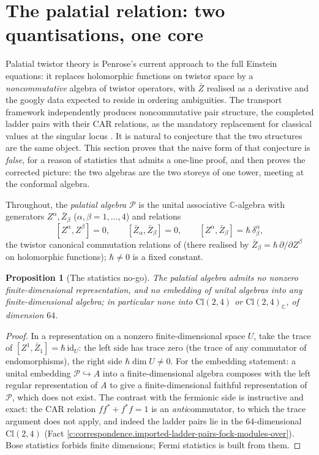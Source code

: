 \documentclass[11pt]{article}
\newtheorem{proposition}[theorem]{Proposition}
\theoremstyle{definition}
\theoremstyle{plain}
\providecommand{\C}{}\renewcommand{\C}{\mathbb{C}}
\providecommand{\Cl}{}\renewcommand{\Cl}{\mathrm{Cl}}
\begin{document}
\section{The palatial relation: two quantisations, one core}

\label{c:note.correspondence.setting-palatial-relation-two-quantisations-one}
Palatial twistor theory \cite{Penrose15} is Penrose's current approach to the full Einstein equations: it replaces holomorphic functions on twistor space by a \emph{noncommutative} algebra of twistor operators, with $\bar Z$ realised as a derivative and the googly data expected to reside in ordering ambiguities. The transport framework independently produces noncommutative pair structure, the completed ladder pairs with their CAR relations, as the mandatory replacement for classical values at the singular locus \cite{ButlerT1}. It is natural to conjecture that the two structures are the same object. This section proves that the naive form of that conjecture is \emph{false}, for a reason of statistics that admits a one-line proof, and then proves the corrected picture: the two algebras are the two storeys of one tower, meeting at the conformal algebra.

Throughout, the \emph{palatial algebra} $\mathcal{P}$ is the unital associative $\C$-algebra with generators $Z^\alpha, \bar Z_\beta$ ($\alpha, \beta = 1, \dots, 4$) and relations
\[
[Z^\alpha, Z^\beta] = 0, \qquad [\bar Z_\alpha, \bar Z_\beta] = 0, \qquad [Z^\alpha, \bar Z_\beta] = \hbar\,\delta^\alpha_\beta ,
\]
the twistor canonical commutation relations of \cite{Penrose15} (there realised by $\bar Z_\beta = \hbar\,\partial/\partial Z^\beta$ on holomorphic functions); $\hbar \neq 0$ is a fixed constant.

\begin{proposition}[The statistics no-go]\label{c:correspondence.statistics-no-go}
The palatial algebra admits no nonzero finite-dimensional representation, and no embedding of unital algebras into any finite-dimensional algebra; in particular none into $\Cl(2,4)$ or $\Cl(2,4)_\C$, of dimension $64$.
\end{proposition}
\begin{proof}
In a representation on a nonzero finite-dimensional space $U$, take the trace of $[Z^1, \bar Z_1] = \hbar\,\mathrm{id}_U$: the left side has trace zero (the trace of any commutator of endomorphisms), the right side $\hbar\dim U \neq 0$. For the embedding statement: a unital embedding $\mathcal{P} \hookrightarrow A$ into a finite-dimensional algebra composes with the left regular representation of $A$ to give a finite-dimensional faithful representation of $\mathcal{P}$, which does not exist. The contrast with the fermionic side is instructive and exact: the CAR relation $ff^* + f^*f = 1$ is an \emph{anti}commutator, to which the trace argument does not apply, and indeed the ladder pairs lie in the $64$-dimensional $\Cl(2,4)$ (Fact \ref{c:correspondence.imported-ladder-pairs-fock-modules-over}). Bose statistics forbids finite dimensions; Fermi statistics is built from them.

\end{proof}
\end{document}
